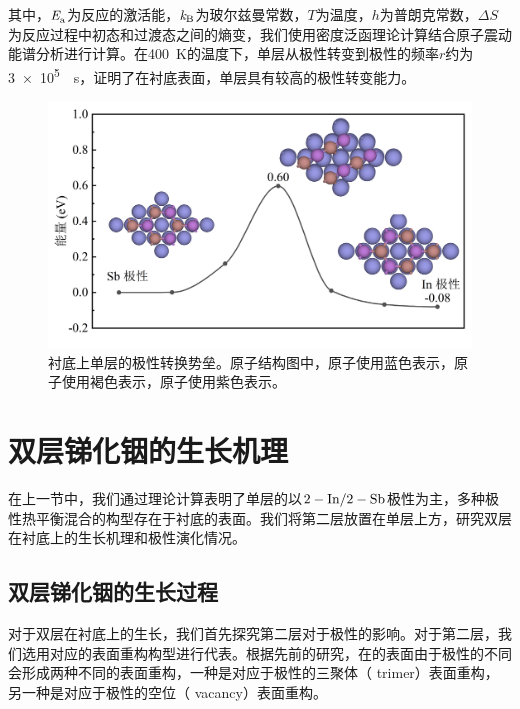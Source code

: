 其中，$\it E_{\rm a}^{\rm } \it$为反应的激活能，$\it k_{\rm B} \it$为玻尔兹曼常数，$T$为温度，$h$为普朗克常数，$\Delta S$为反应过程中初态和过渡态之间的熵变，我们使用密度泛函理论计算结合原子震动能谱分析进行计算。在\SI{400}{\kelvin}的温度下，单层从极性转变到极性的频率$r$约为\SI{3e5}{\per\second}，证明了在衬底表面，单层具有较高的极性转变能力。

\begin{figure}[!htb]
    \includegraphics{pic/IS_DFT_1InSb_flipBarrier.png}
    \caption{衬底上单层的极性转换势垒。原子结构图中，原子使用蓝色表示，原子使用褐色表示，原子使用紫色表示。}
    \label{fig:IS_DFT_1LInSb_InPtoSbPNeb}
\end{figure}

\section{双层锑化铟的生长机理}
在上一节中，我们通过理论计算表明了单层的以$\rm 2-In/2-Sb$极性为主，多种极性热平衡混合的构型存在于衬底的表面。我们将第二层放置在单层上方，研究双层在衬底上的生长机理和极性演化情况。

\subsection{双层锑化铟的生长过程}
\label{cap:IS_2L_growthProcess}
对于双层在衬底上的生长，我们首先探究第二层对于极性的影响。对于第二层，我们选用对应的表面重构构型进行代表。根据先前的研究，在的表面由于极性的不同会形成两种不同的表面重构，一种是对应于极性的三聚体（ trimer）表面重构，另一种是对应于极性的空位（ vacancy）表面重构。

